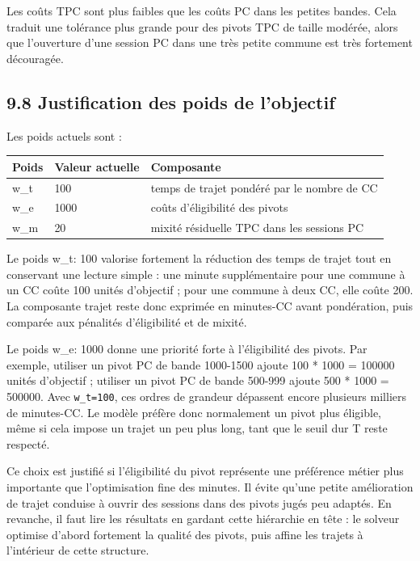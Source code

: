 \documentclass[11pt,a4paper]{article}
\begin{document}
Les coûts TPC sont plus faibles que les coûts PC dans les petites bandes. Cela traduit une tolérance plus grande pour des pivots TPC de taille modérée, alors que l'ouverture d'une session PC dans une très petite commune est très fortement découragée.

\subsection{9.8 Justification des poids de l'objectif}

Les poids actuels sont :

\begin{longtable}{|L{0.24\textwidth}|L{0.18\textwidth}|L{0.48\textwidth}|}
\hline
Poids & Valeur actuelle & Composante \\
\hline
\endhead
w\_t & 100 & temps de trajet pondéré par le nombre de CC \\
\hline
w\_e & 1000 & coûts d'éligibilité des pivots \\
\hline
w\_m & 20 & mixité résiduelle TPC dans les sessions PC \\
\hline
\end{longtable}

Le poids w\_t: 100 valorise fortement la réduction des temps de trajet tout en conservant une lecture simple : une minute supplémentaire pour une commune à un CC coûte 100 unités d'objectif ; pour une commune à deux CC, elle coûte 200. La composante trajet reste donc exprimée en minutes-CC avant pondération, puis comparée aux pénalités d'éligibilité et de mixité.

Le poids w\_e: 1000 donne une priorité forte à l'éligibilité des pivots. Par exemple, utiliser un pivot PC de bande 1000-1500 ajoute 100 * 1000 = 100000 unités d'objectif ; utiliser un pivot PC de bande 500-999 ajoute 500 * 1000 = 500000. Avec \texttt{w\_t=100}, ces ordres de grandeur dépassent encore plusieurs milliers de minutes-CC. Le modèle préfère donc normalement un pivot plus éligible, même si cela impose un trajet un peu plus long, tant que le seuil dur T reste respecté.

Ce choix est justifié si l'éligibilité du pivot représente une préférence métier plus importante que l'optimisation fine des minutes. Il évite qu'une petite amélioration de trajet conduise à ouvrir des sessions dans des pivots jugés peu adaptés. En revanche, il faut lire les résultats en gardant cette hiérarchie en tête : le solveur optimise d'abord fortement la qualité des pivots, puis affine les trajets à l'intérieur de cette structure.
\end{document}
